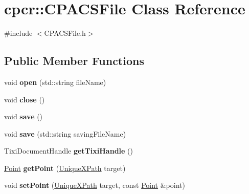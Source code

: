 \hypertarget{classcpcr_1_1CPACSFile}{\section{cpcr\-:\-:C\-P\-A\-C\-S\-File Class Reference}
\label{classcpcr_1_1CPACSFile}
}


{\ttfamily \#include $<$C\-P\-A\-C\-S\-File.\-h$>$}

\subsection*{Public Member Functions}
\begin{DoxyCompactItemize}
\item 
\hypertarget{classcpcr_1_1CPACSFile_a492461f90f8e8da5f7a595a9912aca28}{void {\bfseries open} (std\-::string file\-Name)}\label{classcpcr_1_1CPACSFile_a492461f90f8e8da5f7a595a9912aca28}

\item 
\hypertarget{classcpcr_1_1CPACSFile_a272371a13b81d7d6512d79375b5f1cf8}{void {\bfseries close} ()}\label{classcpcr_1_1CPACSFile_a272371a13b81d7d6512d79375b5f1cf8}

\item 
\hypertarget{classcpcr_1_1CPACSFile_a8abebb99b8fd1e3a79ce24fe9134f2e1}{void {\bfseries save} ()}\label{classcpcr_1_1CPACSFile_a8abebb99b8fd1e3a79ce24fe9134f2e1}

\item 
\hypertarget{classcpcr_1_1CPACSFile_a7d9e18cfa485f9635ebfb2b4e8d8f520}{void {\bfseries save} (std\-::string saving\-File\-Name)}\label{classcpcr_1_1CPACSFile_a7d9e18cfa485f9635ebfb2b4e8d8f520}

\item 
\hypertarget{classcpcr_1_1CPACSFile_a20e10a513ada6219cac8b2306bb149ab}{Tixi\-Document\-Handle {\bfseries get\-Tixi\-Handle} ()}\label{classcpcr_1_1CPACSFile_a20e10a513ada6219cac8b2306bb149ab}

\item 
\hypertarget{classcpcr_1_1CPACSFile_a8010805e557c4b824cb45a63c5a8bfc8}{\hyperlink{classcpcr_1_1Point}{Point} {\bfseries get\-Point} (\hyperlink{classcpcr_1_1UniqueXPath}{Unique\-X\-Path} target)}\label{classcpcr_1_1CPACSFile_a8010805e557c4b824cb45a63c5a8bfc8}

\item 
\hypertarget{classcpcr_1_1CPACSFile_a02bc9069ae93b597a9428fed9e58e2a9}{void {\bfseries set\-Point} (\hyperlink{classcpcr_1_1UniqueXPath}{Unique\-X\-Path} target, const \hyperlink{classcpcr_1_1Point}{Point} \&point)}\label{classcpcr_1_1CPACSFile_a02bc9069ae93b597a9428fed9e58e2a9}


\end{DoxyCompactItemize}
